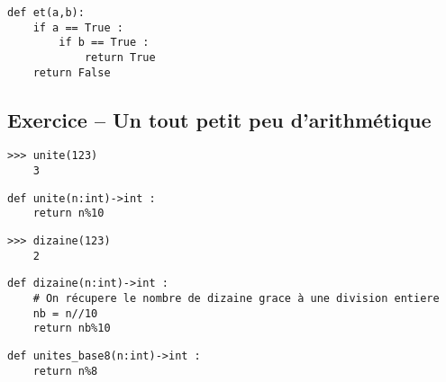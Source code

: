\ifprof
\begin{corrige}
\begin{lstlisting}
def et(a,b):
    if a == True :
        if b == True :
            return True
    return False
\end{lstlisting}
\end{corrige}
\else
\fi


\subsection*{Exercice -- Un tout petit peu d'arithmétique}


\begin{lstlisting}
>>> unite(123)
	3
\end{lstlisting}
\ifprof
\begin{corrige}
\begin{lstlisting}
def unite(n:int)->int :
    return n%10
\end{lstlisting}
\end{corrige}
\else
\fi


\begin{lstlisting}
>>> dizaine(123)
	2
\end{lstlisting}
\ifprof
\begin{corrige}
\begin{lstlisting}
def dizaine(n:int)->int :
    # On récupere le nombre de dizaine grace à une division entiere
    nb = n//10
    return nb%10
\end{lstlisting}
\end{corrige}
\else
\fi

\ifprof
\begin{corrige}
\begin{lstlisting}
def unites_base8(n:int)->int :
    return n%8
\end{lstlisting}
\end{corrige}
\else
\fi

